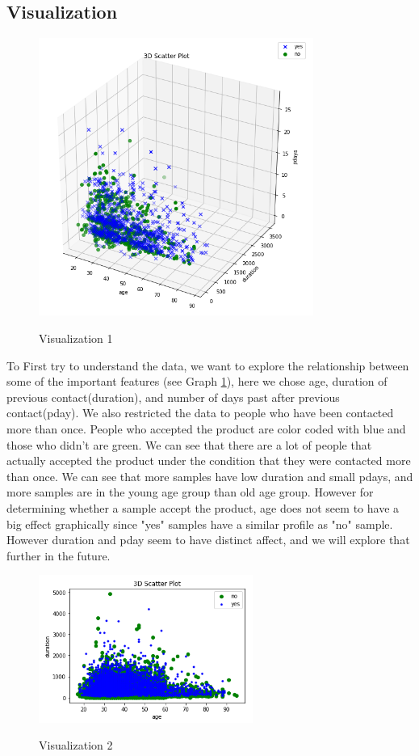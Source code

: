 \documentclass[forprint]{mytemplate}
\begin{document}
\begin{multicols}{2}
\subsection{Visualization}
\begin{figure}[H]
  \centering
  \includegraphics[width=9cm]{3d_age_dur_pd.PNG}\\
  \caption{Visualization 1}\label{g01}
\end{figure}

To First try to understand the data, we want to explore the relationship between some of the important features (see {\color{red}Graph \ref{g01}}), here we chose age, duration of previous contact(duration), and number of days past after previous contact(pday). We also restricted the data to people who have been contacted more than once. People who accepted the product are color coded with blue and those who didn't are green. We can see that there are a lot of people that actually accepted the product under the condition that they were contacted more than once. We can see that more samples have low duration and small pdays, and more samples are in the young age group than old age group. However for determining whether a sample accept the product, age does not seem to have a big effect graphically since "yes" samples have a similar profile as "no" sample. However duration and pday seem to have distinct affect, and we will explore that further in the future.
\begin{figure}[H]
  \centering
  \includegraphics[width=7cm]{age_dur_scatter.PNG}\\
  \caption{Visualization 2}\label{g02}
\end{figure}


\end{multicols}
\end{document}
